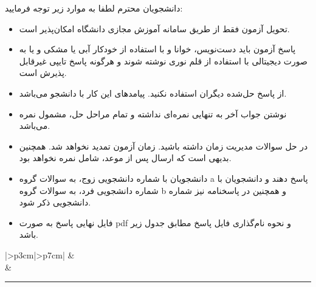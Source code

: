 \documentclass[a4paper,10pt]{article}
\begin{document}
\begin{infobox}
	دانشجویان محترم لطفا به موارد زیر توجه فرمایید:
	\begin{itemize}
		\itemsep0.4em
		\item
		تحویل آزمون فقط از طریق سامانه آموزش مجازی دانشگاه امکان‌پذیر است.
		\item
		پاسخ آزمون باید دست‌نویس، خوانا و با استفاده از خودکار آبی یا مشکی و یا به صورت دیجیتالی با استفاده از قلم نوری نوشته شوند و هرگونه پاسخ تایپی غیرقابل پذیرش است.
		\item
		از پاسخ حل‌شده دیگران استفاده نکنید. پیامدهای این کار با دانشجو می‌باشد.
		\item
		نوشتن جواب آخر به تنهایی نمره‌ای نداشته و تمام مراحل حل، مشمول نمره می‌باشد.
		\item
		در حل سوالات مدیریت زمان داشته باشید. زمان آزمون تمدید نخواهد شد. همچنین بدیهی است که ارسال پس از موعد، شامل نمره نخواهد بود.
		\item
		دانشجویان با شماره دانشجویی زوج، به سوالات گروه a پاسخ دهند و دانشجویان با شماره دانشجویی فرد، به سوالات گروه b و همچنین در پاسخنامه نیز شماره دانشجویی ذکر شود.
		\item 
		فایل نهایی پاسخ به صورت pdf و نحوه نام‌گذاری فایل پاسخ مطابق جدول زیر باشد.
		
	\end{itemize}
	
	
	\vspace{2pt}
	
	\begin{center}
		\begin{tabular}{|>{\centering\arraybackslash}p{3cm}|>{\centering\arraybackslash}p{7cm}|}
			\hline
			\textcolor{AccentCyan}{\bfseries{}} &
			\texttt{} \\
			\hline
			\textcolor{AccentGold}{\bfseries{}} &
			\textcolor{TextMuted}{\texttt{}} \\
			\hline
		\end{tabular}
		\label{tab:file_format}
	\end{center}
	
\end{infobox}


\vspace{2pt}
\textcolor{AccentCyan}{\rule{\linewidth}{0.8pt}}
\end{document}
